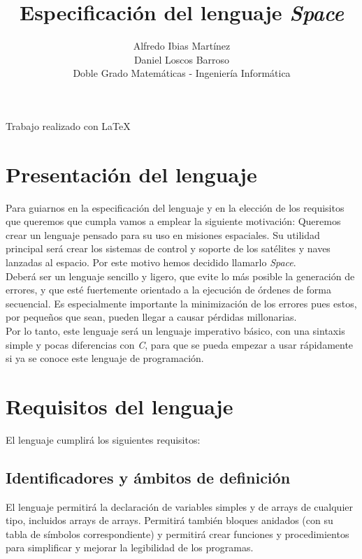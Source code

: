 \documentclass[a4paper, 12pt]{article}
\begin{document}
\title{\Huge \bf Especificación del lenguaje \textit{Space}}
\author{
	\small Alfredo Ibias Martínez\\
	\small Daniel Loscos Barroso\\
    \small Doble Grado Matemáticas - Ingeniería Informática
    }
\date{}
\maketitle

\vfill
\begin{center}
{\footnotesize Trabajo realizado con \LaTeX}
\end{center}
\newpage

\begin{center}
\tableofcontents
\end{center}
\newpage

\section{Presentación del lenguaje}

Para guiarnos en la especificación del lenguaje y en la elección de los requisitos que queremos que cumpla vamos a emplear la siguiente motivación: Queremos crear un lenguaje pensado para su uso en misiones espaciales. Su utilidad principal será crear los sistemas de control y soporte de los satélites y naves lanzadas al espacio. Por este motivo hemos decidido llamarlo \textit{Space}.\\

Deberá ser un lenguaje sencillo y ligero, que evite lo más posible la generación de errores, y que esté fuertemente orientado a la ejecución de órdenes de forma secuencial. Es especialmente importante la minimización de los errores pues estos, por pequeños que sean, pueden llegar a causar pérdidas millonarias.\\

Por lo tanto, este lenguaje será un lenguaje imperativo básico, con una sintaxis simple y pocas diferencias con \textit{C}, para que se pueda empezar a usar rápidamente si ya se conoce este lenguaje de programación.\\

\section{Requisitos del lenguaje}
El lenguaje cumplirá los siguientes requisitos:
\subsection{Identificadores y ámbitos de definición}
El lenguaje permitirá la declaración de variables simples y de arrays de cualquier tipo, incluidos arrays de arrays. Permitirá también bloques anidados (con su tabla de símbolos correspondiente) y permitirá crear funciones y procedimientos para simplificar y mejorar la legibilidad de los programas.\\
\end{document}
